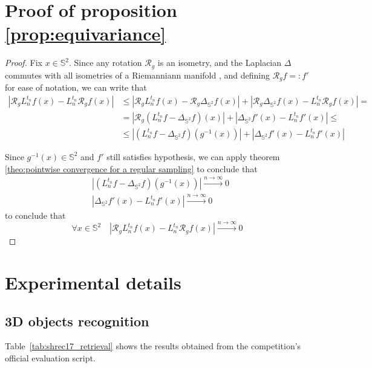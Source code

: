 \documentclass{article} %
\newcommand{\laplacian}{\Delta_{\mathbb S^2}}
\newcommand{\Rg}{\mathcal R_g}
\newcommand{\seminorm}[1]{\left|#1\right|}
\newcommand{\Ln}{L_n^{t_n}}
\newcommand{\Tabref}[1]{Table~\ref{tab:#1}}
\begin{document}
\section{Proof of proposition \ref{prop:equivariance}}
\begin{proof}
Fix $x\in \mathbb S^2$. Since any rotation $\mathcal R_g$ is an isometry, and the Laplacian $\Delta$ commutes with all isometries of a Riemanniann manifold \cite{shubin}, and defining $\mathcal R_g f =: f'$ for ease of notation, we can write that 
	\begin{align*}
			\seminorm{\Rg \Ln f (x) - \Ln \Rg f(x) } &\leq \seminorm{\Rg \Ln f (x) - \Rg \laplacian f(x)} + \seminorm{\Rg \laplacian f (x) - \Ln \Rg f(x)} =\\
			& =\seminorm{\Rg (\Ln f - \laplacian f ) (x)} + \seminorm{ \laplacian f' (x) - \Ln f'(x)} \leq \\
			& \leq \seminorm{(\Ln f - \laplacian f ) (g^{-1}(x))} + \seminorm{ \laplacian f' (x) - \Ln f'(x)}
	\end{align*}
	
Since $g^{-1}(x)\in\mathbb{S}^2$ and $f'$ still satisfies hypothesis, we can apply theorem \ref{theo:pointwise convergence for a regular sampling} to conclude that
\begin{align*}
 &\seminorm{(\Ln f - \laplacian f ) (g^{-1}(x))} \xrightarrow{n\to\infty}0\\
  &\seminorm{ \laplacian f' (x) - \Ln f'(x)}\xrightarrow{n\to\infty}0
\end{align*}
to conclude that $$\forall x\in\mathbb S^2 \quad\seminorm{\Rg \Ln f (x) - \Ln \Rg f(x) } \xrightarrow{n\to\infty}0$$

\end{proof}


\section{Experimental details}

\subsection{3D objects recognition}

\Tabref{shrec17_retrieval} shows the results obtained from the competition's official evaluation script.
\end{document}

